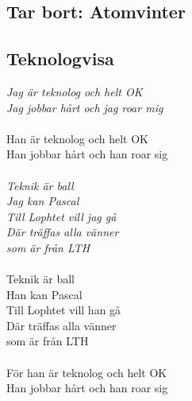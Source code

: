 \newpage


\subsection*{Tar bort: Atomvinter} 



\newpage


\subsection*{Teknologvisa} 

\noindent\textit{Jag är teknolog och helt OK\\
Jag jobbar hårt och jag roar mig}\\\\
\noindent Han är teknolog och helt OK\\
Han jobbar hårt och han roar sig\\\\
\noindent\textit{Teknik är ball\\
Jag kan Pascal\\
Till Lophtet vill jag gå\\
Där träffas alla vänner\\
som är från LTH}\\\\
\noindent Teknik är ball\\
Han kan Pascal\\
Till Lophtet vill han gå\\
Där träffas alla vänner\\
som är från LTH\\\\
\noindent För han är teknolog och helt OK\\
Han jobbar hårt och han roar sig\\\\


